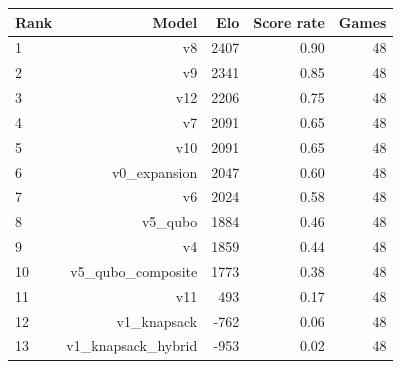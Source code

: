 \begin{tabular}{lrrrr}
\toprule
Rank & Model & Elo & Score rate & Games \\
\midrule
1 & v8 & 2407 & 0.90 & 48 \\
2 & v9 & 2341 & 0.85 & 48 \\
3 & v12 & 2206 & 0.75 & 48 \\
4 & v7 & 2091 & 0.65 & 48 \\
5 & v10 & 2091 & 0.65 & 48 \\
6 & v0\_expansion & 2047 & 0.60 & 48 \\
7 & v6 & 2024 & 0.58 & 48 \\
8 & v5\_qubo & 1884 & 0.46 & 48 \\
9 & v4 & 1859 & 0.44 & 48 \\
10 & v5\_qubo\_composite & 1773 & 0.38 & 48 \\
11 & v11 & 493 & 0.17 & 48 \\
12 & v1\_knapsack & -762 & 0.06 & 48 \\
13 & v1\_knapsack\_hybrid & -953 & 0.02 & 48 \\
\bottomrule
\end{tabular}

